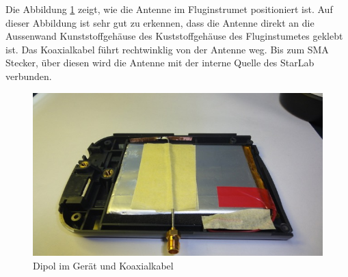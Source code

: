 \newpage
Die Abbildung \ref{fig:DipolimGeraet} zeigt, wie die Antenne im Fluginstrumet positioniert ist. Auf dieser Abbildung ist sehr gut zu erkennen, dass die Antenne direkt an die Aussenwand Kunststoffgehäuse des Kuststoffgehäuse des Fluginstumetes geklebt ist. Das Koaxialkabel führt rechtwinklig von der Antenne weg. Bis zum SMA Stecker, über diesen wird die Antenne mit der interne Quelle des StarLab verbunden.\\
\begin{figure}[!ht]
	\centering
	\includegraphics[width=13cm]{content/bilder/Implementierung/DipolKabelGeraet.jpg}%
	\caption{Dipol im Gerät und Koaxialkabel}
	\label{fig:DipolimGeraet}
\end{figure}






